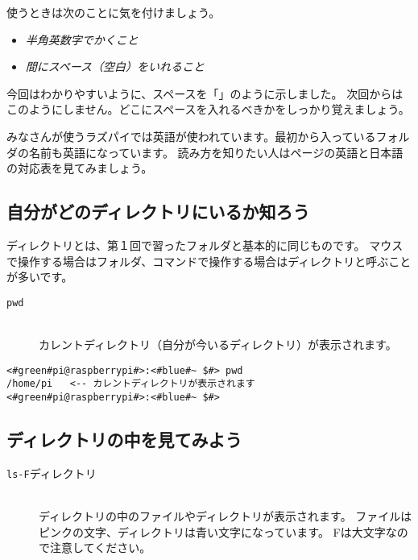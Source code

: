 使うときは次のことに気を付けましょう。
\begin{itemize}
\item \emph{半角英数字でかくこと}
\item \emph{間にスペース（空白）をいれること}
\end{itemize}

今回はわかりやすいように、スペースを「\textvisiblespace 」のように示しました。
次回からはこのようにしません。どこにスペースを入れるべきかをしっかり覚えましょう。

みなさんが使うラズパイでは英語が使われています。最初から入っているフォルダの名前も英語になっています。
読み方を知りたい人は\pageref{英語と日本語の対応表}ページの英語と日本語の対応表を見てみましょう。

\subsection{自分がどのディレクトリにいるか知ろう}
ディレクトリとは、第１回で習ったフォルダと基本的に同じものです。
マウスで操作する場合はフォルダ、コマンドで操作する場合はディレクトリと呼ぶことが多いです。

\begin{description}
\item[\texttt{pwd}]\mbox{}\\
 カレントディレクトリ（自分が今いるディレクトリ）が表示されます。
\end{description}

\begin{lstlisting}[caption=pwdコマンドの例,label=pwdtest]
<#green#pi@raspberrypi#>:<#blue#~ $#> pwd
/home/pi   <-- カレントディレクトリが表示されます
<#green#pi@raspberrypi#>:<#blue#~ $#>
\end{lstlisting}

\begin{tcolorbox}[title=\useOmetoi]
\begin{enumerate}
\end{enumerate}
\end{tcolorbox}


\subsection{ディレクトリの中を見てみよう}
\begin{description}
\item[\texttt{ls}\textvisiblespace \texttt{-F}\textvisiblespace ディレクトリ]\mbox{}\\
ディレクトリの中のファイルやディレクトリが表示されます。
ファイルはピンクの文字、ディレクトリは青い文字になっています。
Fは大文字なので注意してください。
\end{description}

